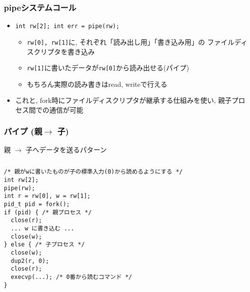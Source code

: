 \documentclass[12pt,dvipdfmx]{beamer}
\begin{document}
\begin{frame}[fragile]
  \frametitle{pipeシステムコール}
  \begin{itemize}
  \item {\tt int rw[2]; int err = pipe(rw);}
    \begin{itemize}
    \item {\tt rw[0], rw[1]}に, それぞれ「読み出し用」「書き込み用」の
      ファイルディスクリプタを書き込み
    \item {\tt rw[1]}に書いたデータが{\tt rw[0]}から読み出せる(パイプ)
    \item もちろん実際の読み書きはread, writeで行える
    \end{itemize}
  \item これと, fork時にファイルディスクリプタが継承する仕組みを使い,
    親子プロセス間での通信が可能
  \end{itemize}
\end{frame}

\begin{frame}[fragile]
  \frametitle{パイプ (親$\rightarrow$ 子)}
親 $\rightarrow$ 子へデータを送るパターン
  \begin{columns}
    \begin{column}{0.55\textwidth}
\begin{lstlisting}
/* 親がwに書いたものが子の標準入力(0)から読めるようにする */
int rw[2];
pipe(rw);
int r = rw[0], w = rw[1];
pid_t pid = fork();
if (pid) { /* 親プロセス */
  close(r);
  ... w に書き込む ...
  close(w);
} else { /* 子プロセス */
  close(w);
  dup2(r, 0);
  close(r);
  execvp(...); /* 0番から読むコマンド */
}
\end{lstlisting}
\end{column}

\begin{column}{0.45\textwidth}
\begin{center}
%
%
%
%
%
%
%
\end{center}
\end{column}
\end{columns}
\end{frame}
\end{document}
